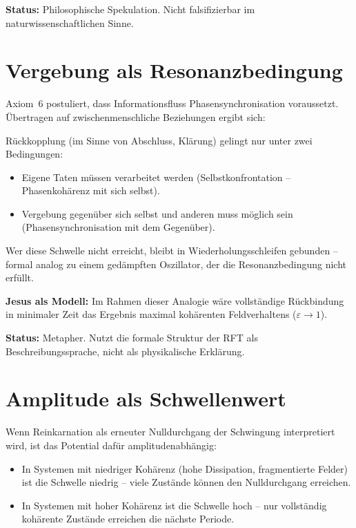 \documentclass[a4paper,11pt]{article}
\begin{document}
	\textbf{Status:} Philosophische Spekulation. Nicht
	falsifizierbar im naturwissenschaftlichen Sinne.
	
	\section{Vergebung als Resonanzbedingung}
	
	Axiom~6 postuliert, dass Informationsfluss
	Phasensynchronisation voraussetzt. \"Ubertragen auf
	zwischenmenschliche Beziehungen ergibt sich:
	
	R\"uckkopplung (im Sinne von Abschluss, Kl\"arung)
	gelingt nur unter zwei Bedingungen:
	\begin{itemize}
		\item Eigene Taten m\"ussen verarbeitet werden
		(Selbstkonfrontation -- Phasenkoh\"arenz mit
		sich selbst).
		\item Vergebung gegen\"uber sich selbst und anderen
		muss m\"oglich sein (Phasensynchronisation mit
		dem Gegen\"uber).
	\end{itemize}
	
	Wer diese Schwelle nicht erreicht, bleibt in
	Wiederholungsschleifen gebunden -- formal analog
	zu einem ged\"ampften Oszillator, der die
	Resonanzbedingung nicht erf\"ullt.
	
	\textbf{Jesus als Modell:} Im Rahmen dieser Analogie
	w\"are vollst\"andige R\"uckbindung in minimaler Zeit
	das Ergebnis maximal koh\"arenten Feldverhaltens
	($\varepsilon \to 1$).
	
	\textbf{Status:} Metapher. Nutzt die formale Struktur
	der RFT als Beschreibungssprache, nicht als physikalische
	Erkl\"arung.
	
	\section{Amplitude als Schwellenwert}
	
	Wenn Reinkarnation als erneuter Nulldurchgang der
	Schwingung interpretiert wird, ist das Potential daf\"ur
	amplitudenabh\"angig:
	
	\begin{itemize}
		\item In Systemen mit niedriger Koh\"arenz (hohe
		Dissipation, fragmentierte Felder) ist die Schwelle
		niedrig -- viele Zust\"ande k\"onnen den Nulldurchgang
		erreichen.
		\item In Systemen mit hoher Koh\"arenz ist die Schwelle
		hoch -- nur vollst\"andig koh\"arente Zust\"ande
		erreichen die n\"achste Periode.
	\end{itemize}
	
\end{document}
